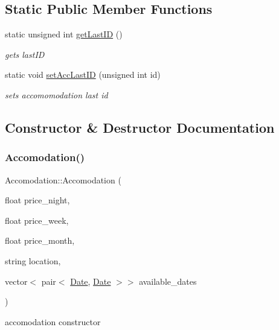 \subsection*{Static Public Member Functions}
\begin{DoxyCompactItemize}
\item 
static unsigned int \hyperlink{class_accomodation_a2ceca7929ed995f3fdc40e3d6b7e017c}{get\+Last\+ID} ()
\begin{DoxyCompactList}\small\item\em gets last\+ID \end{DoxyCompactList}\item 
static void \hyperlink{class_accomodation_a5554cdc8b46ae1fb92c94bf4696f9b77}{set\+Acc\+Last\+ID} (unsigned int id)
\begin{DoxyCompactList}\small\item\em sets accomomodation last id \end{DoxyCompactList}\end{DoxyCompactItemize}


\subsection{Constructor \& Destructor Documentation}
\hypertarget{class_accomodation_a6f9d474e6bf2cd77d0046c3584a50bc6}{}\label{class_accomodation_a6f9d474e6bf2cd77d0046c3584a50bc6} 
\subsubsection{\texorpdfstring{Accomodation()}{Accomodation()}\hspace{0.1cm}{\footnotesize\ttfamily [1/2]}}
{\footnotesize\ttfamily Accomodation\+::\+Accomodation (\begin{DoxyParamCaption}\item[{float}]{price\+\_\+night,  }\item[{float}]{price\+\_\+week,  }\item[{float}]{price\+\_\+month,  }\item[{string}]{location,  }\item[{vector$<$ pair$<$ \hyperlink{class_date}{Date}, \hyperlink{class_date}{Date} $>$$>$}]{available\+\_\+dates }\end{DoxyParamCaption})}



accomodation constructor 


